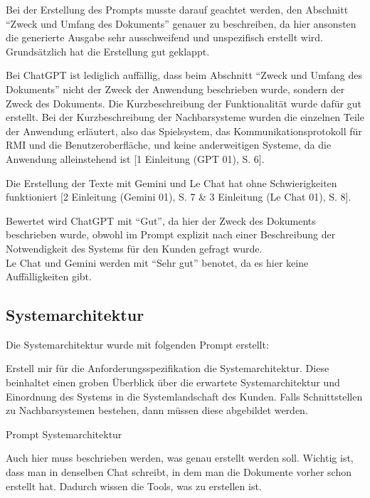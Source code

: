 Bei der Erstellung des Prompts musste darauf geachtet werden, den Abschnitt ``Zweck und Umfang des Dokuments'' genauer zu beschreiben, da hier 
ansonsten die generierte Ausgabe sehr ausschweifend und unspezifisch erstellt wird. Grundsätzlich hat die Erstellung gut geklappt.

Bei ChatGPT ist lediglich auffällig, dass beim Abschnitt ``Zweck und Umfang des Dokuments'' nicht der Zweck der Anwendung beschrieben wurde, 
sondern der Zweck des Dokuments. Die Kurzbeschreibung der Funktionalität wurde dafür gut erstellt. Bei der Kurzbeschreibung der 
Nachbarsysteme wurden die einzelnen Teile der Anwendung erläutert, also das Spielsystem, das Kommunikationsprotokoll für RMI und die 
Benutzeroberfläche, und keine anderweitigen Systeme, da die Anwendung alleinstehend ist [1 Einleitung (GPT 01), S. 6].

Die Erstellung der Texte mit Gemini und Le Chat hat ohne Schwierigkeiten funktioniert [2 Einleitung (Gemini 01), S. 7 \& 3 Einleitung (Le Chat 01), S. 8].

Bewertet wird ChatGPT mit ``Gut'', da hier der Zweck des Dokuments beschrieben wurde, obwohl im Prompt explizit nach einer Beschreibung der 
Notwendigkeit des Systems für den Kunden gefragt wurde.\\
Le Chat und Gemini werden mit ``Sehr gut'' benotet, da es hier keine Auffälligkeiten gibt.

\subsection*{Systemarchitektur}

Die Systemarchitektur wurde mit folgenden Prompt erstellt:

\begin{prompt}[H]
    \begin{tcolorbox}[colback=gray!20, colframe=gray!20, boxrule=0pt, sharp corners] 
        Erstell mir für die Anforderungsspezifikation die Systemarchitektur. Diese beinhaltet einen groben Überblick über die erwartete Systemarchitektur 
        und Einordnung des Systems in die Systemlandschaft des Kunden. Falls Schnittstellen zu Nachbarsystemen bestehen, dann müssen diese abgebildet werden.
        \vfill
    \end{tcolorbox}
    \caption{Prompt Systemarchitektur}
    \label{Prompt Systemarchitektur}
\end{prompt}

Auch hier muss beschrieben werden, was genau erstellt werden soll. Wichtig ist, dass man in denselben Chat schreibt, in dem man die 
Dokumente vorher schon erstellt hat. Dadurch wissen die Tools, was zu erstellen ist.

